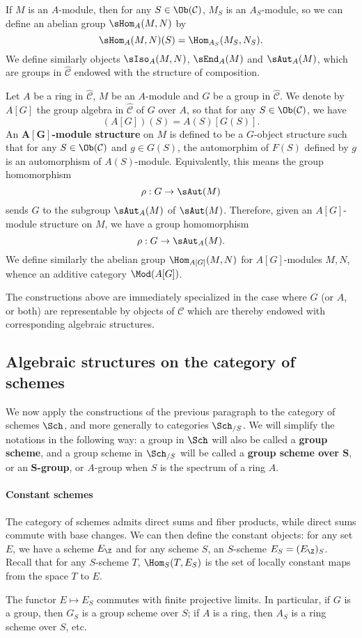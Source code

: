 \begin{definition}
If $M$ is an $A$-module, then for any $S\in\Ob(\mathcal{C})$, $M_S$ is an $A_S$-module, so we can define an abelian group $\sHom_A(M,N)$ by
\[\sHom_A(M,N)(S)=\Hom_{A_S}(M_S,N_S).\]
We define similarly objects $\sIso_A(M,N)$, $\sEnd_A(M)$ and $\sAut_A(M)$, which are groups in $\widehat{\mathcal{C}}$ endowed with the structure of composition.
\end{definition}

\begin{definition}
Let $A$ be a ring in $\widehat{\mathcal{C}}$, $M$ be an $A$-module and $G$ be a group in $\widehat{\mathcal{C}}$. We denote by $A[G]$ the group algebra in $\widehat{\mathcal{C}}$ of $G$ over $A$, so that for any $S\in\Ob(\mathcal{C})$, we have 
\[(A[G])(S)=A(S)[G(S)].\]
An \textbf{$\bm{A[G]}$-module structure} on $M$ is defined to be a $G$-object structure such that for any $S\in\Ob(\mathcal{C})$ and $g\in G(S)$, the automorphim of $F(S)$ defined by $g$ is an automorphism of $A(S)$-module. Equivalently, this means the group homomorphism
\[\rho:G\to\sAut(M)\]
sends $G$ to the subgroup $\sAut_A(M)$ of $\sAut(M)$. Therefore, given an $A[G]$-module structure on $M$, we have a group homomorphism
\[\rho:G\to\sAut_A(M).\]
We define similarly the abelian group $\Hom_{A[G]}(M,N)$ for $A[G]$-modules $M,N$, whence an additive category $\Mod(A[G])$.
\end{definition}
The constructions above are immediately specialized in the case where $G$ (or $A$, or both) are representable by objects of $\mathcal{C}$ which are thereby endowed with corresponding algebraic structures.

\subsection{Algebraic structures on the category of schemes}
We now apply the constructions of the previous paragraph to the category of schemes $\Sch$, and more generally to categories $\Sch_{/S}$. We will simplify the notations in the following way: a group in $\Sch$ will also be called a \textbf{group scheme}, and a group scheme in $\Sch_{/S}$ will be called a \textbf{group scheme over $\bm{S}$}, or an \textbf{$\bm{S}$-group}, or $A$-group when $S$ is the spectrum of a ring $A$.
\paragraph{Constant schemes}
The category of schemes admits direct sums and fiber products, while direct sums commute with base changes. We can then define the constant objects: for any set $E$, we have a scheme $E_\Z$ and for any scheme $S$, an $S$-scheme $E_S=(E_\Z)_S$. Recall that for any $S$-scheme $T$, $\Hom_S(T,E_S)$ is the set of locally constant maps from the space $T$ to $E$.\par
The functor $E\mapsto E_S$ commutes with finite projective limits. In particular, if $G$ is a group, then $G_S$ is a group scheme over $S$; if $A$ is a ring, then $A_S$ is a ring scheme over $S$, etc.
